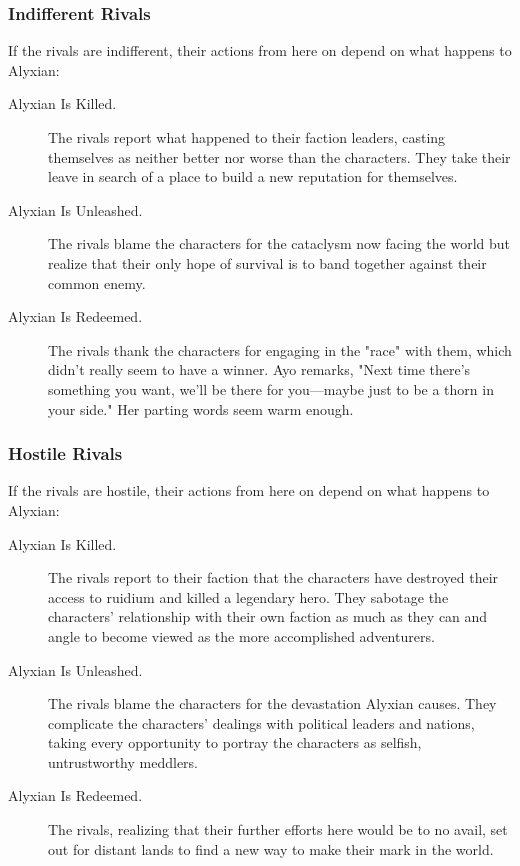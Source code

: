 \documentclass[10pt,a4paper,twoside,bg=print,twocolumn,openany,nodeprecatedcode]{dndbook}
\begin{document}
\subsubsection{Indifferent Rivals}
If the rivals are indifferent, their actions from here on depend on what happens to Alyxian:


\begin{description}
\item[Alyxian Is Killed.]
The rivals report what happened to their faction leaders, casting themselves as neither better nor worse than the characters. They take their leave in search of a place to build a new reputation for themselves.
\item[Alyxian Is Unleashed.]
The rivals blame the characters for the cataclysm now facing the world but realize that their only hope of survival is to band together against their common enemy.
\item[Alyxian Is Redeemed.]
The rivals thank the characters for engaging in the "race" with them, which didn't really seem to have a winner. Ayo remarks, "Next time there's something you want, we'll be there for you—maybe just to be a thorn in your side." Her parting words seem warm enough.
\end{description}

\subsubsection{Hostile Rivals}
If the rivals are hostile, their actions from here on depend on what happens to Alyxian:


\begin{description}
\item[Alyxian Is Killed.]
The rivals report to their faction that the characters have destroyed their access to ruidium and killed a legendary hero. They sabotage the characters' relationship with their own faction as much as they can and angle to become viewed as the more accomplished adventurers.
\item[Alyxian Is Unleashed.]
The rivals blame the characters for the devastation Alyxian causes. They complicate the characters' dealings with political leaders and nations, taking every opportunity to portray the characters as selfish, untrustworthy meddlers.
\item[Alyxian Is Redeemed.]
The rivals, realizing that their further efforts here would be to no avail, set out for distant lands to find a new way to make their mark in the world.
\end{description}
\end{document}
